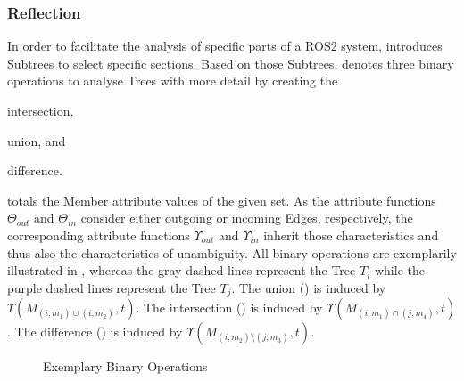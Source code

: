     \subsubsection{Reflection}
    In order to facilitate the analysis of specific parts of a ROS2 system,  introduces Subtrees to select specific sections. Based on those Subtrees,  denotes three binary operations to analyse Trees with more detail by creating the
    \begin{enumerate*}[label=\Alph*)]
        \item intersection,
        \item union, and
        \item difference.
    \end{enumerate*}
     totals the Member attribute values of the given set. As the attribute functions $\Theta_{out}$ and $\Theta_{in}$ consider either outgoing or incoming Edges, respectively, the corresponding attribute functions $\Upsilon_{out}$ and $\Upsilon_{in}$ inherit those characteristics and thus also the characteristics of unambiguity. All binary operations are exemplarily illustrated in , whereas the gray dashed lines represent the Tree $T_i$ while the purple dashed lines represent the Tree $T_j$. The union () is induced by $\Upsilon(M_{(i,m_1)\cup(i,m_2)},t)$. The intersection () is induced by $\Upsilon(M_{(i,m_1)\cap(j,m_4)},t)$. The difference () is induced by $\Upsilon(M_{(i,m_2)\setminus(j,m_3)},t)$.
    \begin{figure}[h]
        \centering
        
        \caption[Exemplary Binary Operations]{Exemplary Binary Operations \legendadapted} \label{fig:tikz:mathModel:binaryAggregation}
    \end{figure}

\vspace{-.75cm}
